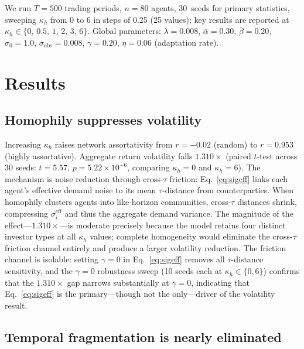 \documentclass[preprint,12pt,authoryear]{elsarticle}
\begin{document}
We run $T = 500$ trading periods, $n = 80$ agents, 30~seeds for primary
statistics, sweeping $\kappa_h$ from 0 to 6 in steps of 0.25 (25 values);
key results are reported at $\kappa_h \in \{0,\,0.5,\,1,\,2,\,3,\,6\}$.
Global parameters: $\lambda = 0.008$, $\bar{\alpha} = 0.30$,
$\bar{\beta} = 0.20$, $\sigma_0 = 1.0$, $\sigma_{\mathrm{obs}} = 0.008$,
$\gamma = 0.20$, $\eta = 0.06$ (adaptation rate).

\section{Results}
\label{sec:results}

\subsection{Homophily suppresses volatility}

Increasing $\kappa_h$ raises network assortativity from $r = -0.02$
(random) to $r = 0.953$ (highly assortative).
Aggregate return volatility falls $1.310\times$
(paired $t$-test across 30 seeds: $t = 5.57$, $p = 5.22 \times 10^{-6}$,
comparing $\kappa_h = 0$ and $\kappa_h = 6$).
The mechanism is noise reduction through cross-$\tau$ friction:
Eq.~\eqref{eq:sigeff} links each agent's effective demand noise to its mean
$\tau$-distance from counterparties.
When homophily clusters agents into like-horizon communities,
cross-$\tau$ distances shrink, compressing $\sigma_i^{\mathrm{eff}}$ and
thus the aggregate demand variance.
The magnitude of the effect---$1.310\times$---is moderate precisely because
the model retains four distinct investor types at all $\kappa_h$ values;
complete homogeneity would eliminate the cross-$\tau$ friction channel
entirely and produce a larger volatility reduction.
The friction channel is isolable: setting $\gamma = 0$ in
Eq.~\eqref{eq:sigeff} removes all $\tau$-distance sensitivity, and
the $\gamma = 0$ robustness sweep (10 seeds each at $\kappa_h \in \{0, 6\}$)
confirms that the $1.310\times$ gap narrows substantially at $\gamma = 0$,
indicating that Eq.~\eqref{eq:sigeff} is the primary---though not the
only---driver of the volatility result.

\subsection{Temporal fragmentation is nearly eliminated}
\end{document}
